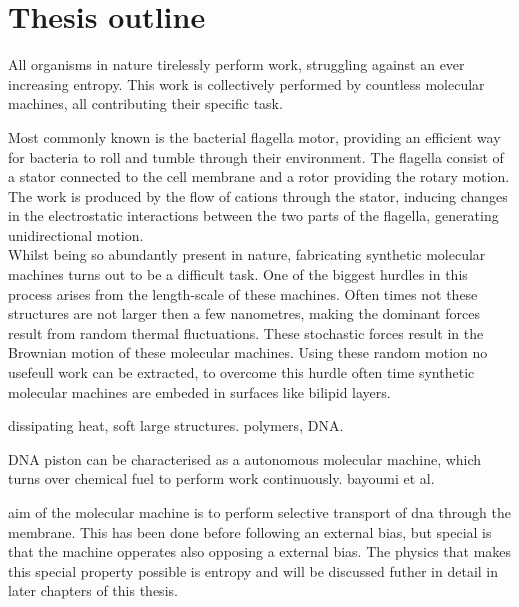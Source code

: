 \section{Thesis outline}

All organisms in nature tirelessly perform work, struggling against an ever increasing
entropy. This work is collectively performed by countless molecular machines, all
contributing their specific task.

Most commonly known is the bacterial flagella motor, providing an efficient way for
bacteria to roll and tumble through their environment. The flagella consist of a
stator connected to the cell membrane and a rotor providing the rotary motion. The
work is produced by the flow of cations through the stator, inducing changes in the
electrostatic interactions between the two parts of the flagella, generating
unidirectional motion.\\

Whilst being so abundantly present in nature, fabricating synthetic molecular machines
turns out to be a difficult task.
One of the biggest hurdles in this process arises from the length-scale of these
machines. Often times not these structures are not larger then a few nanometres, making
the dominant forces result from random thermal fluctuations. These stochastic forces
result in the Brownian motion of these molecular machines. Using these random motion no
usefeull work can be extracted, to overcome this hurdle often time synthetic molecular
machines are embeded in surfaces like bilipid layers.





dissipating heat, soft large structures.  polymers, DNA.

DNA piston can be characterised as a autonomous molecular machine, which turns
over chemical fuel to perform work continuously. bayoumi et al.

aim of the molecular machine is to perform selective transport of dna through the
membrane. This has been done before following an external bias, but special is that the
machine opperates also opposing a external bias. The physics that makes this special
property possible is entropy and will be discussed futher in detail in later chapters of
this thesis.

